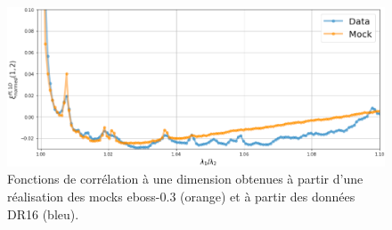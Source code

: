 \begin{figure}
  \centering
  \includegraphics[scale=0.45]{cf1d_eboss03}
  \caption{Fonctions de corrélation à une dimension obtenues à partir d'une réalisation des mocks eboss-0.3 (orange) et à partir des données DR16 (bleu).}
  \label{fig:cf1d_eboss03}
\end{figure}



% 
